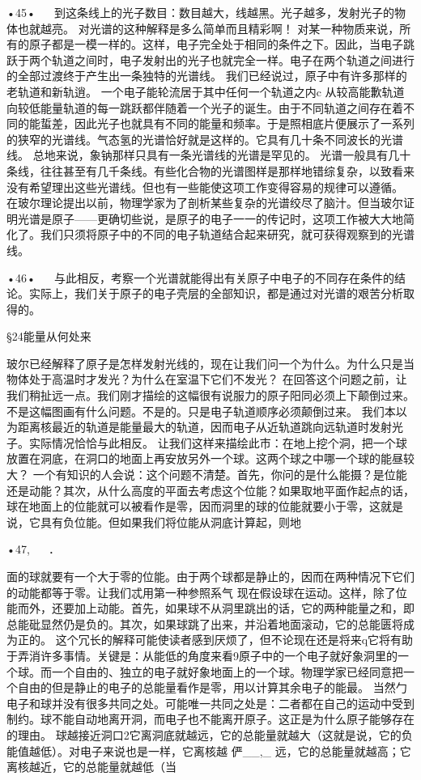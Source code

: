 •45•
  
到这条线上的光子数目：数目越大，线越黑。光子越多，发射光子的物体也就越亮。
对光谱的这种解释是多么简单而且精彩啊！
对某一种物质来说，所有的原子都是一模一样的。这样，电子完全处于相同的条件之下。因此，当电子跳跃于两个轨道之间时，电子发射出的光子也就完全一样。电子在两个轨道之间进行的全部过渡终于产生出一条独特的光谱线。
我们已经说过，原子中有许多那样的老轨道和新轨逍。
一个电子能轮流居于其中任何一个轨道之内c
从较高能歉轨道向较低能量轨道的每一跳跃都伴随着一个光子的诞生。由于不同轨道之间存在着不同的能蜇差，因此光子也就具有不同的能量和频率。于是照相底片便展示了一系列的狭窄的光谱线。气态氢的光谱恰好就是这样的。它具有几十条不同波长的光谱线。
总地来说，象钠那样只具有一条光谱线的光谱是罕见的。
光谱一般具有几十条线，往往甚至有几千条线。有些化合物的光谱图样是那样地错综复杂，以致看来没有希望理出这些光谱线。但也有一些能使这项工作变得容易的规律可以遵循。
在玻尔理论提出以前，物理学家为了剖析某些复杂的光谱绞尽了脑汁。但当玻尔证明光谱是原子——更确切些说，是原子的电子一一的传记时，这项工作被大大地简化了。我们只须将原子中的不同的电子轨道结合起来研究，就可获得观察到的光谱线。

•46•
  
与此相反，考察一个光谱就能得出有关原子中电子的不同存在条件的结论。实际上，我们关于原子的电子壳层的全部知识，都是通过对光谱的艰苦分析取得的。

§24能量从何处来

玻尔已经解释了原子是怎样发射光线的，现在让我们问一个为什么。为什么只是当物体处于高温时才发光？为什么在室温下它们不发光？
在回答这个问题之前，让我们稍扯远一点。我们刚才描绘的这幅很有说服力的原子阳同必须上下颠倒过来。不是这幅图画有什么问题。不是的。只是电子轨道顺序必须颠倒过来。
我们本以为距离核最近的轨道是能量最大的轨道，因而电子从近轨道跳向远轨道时发射光子。实际情况恰恰与此相反。
让我们这样来描绘此市：在地上挖个洞，把一个球放置在洞底，在洞口的地面上再安放另外一个球。这两个球之中哪一个球的能昼较大？
一个有知识的人会说：这个问题不清楚。首先，你问的是什么能摄？是位能还是动能？其次，从什么高度的平面去考虑这个位能？如果取地平面作起点的话，球在地面上的位能就可以被看作是零，因而洞里的球的位能就要小于零，这就是说，它具有负位能。但如果我们将位能从洞底计算起，则地

•47,
  
．

面的球就要有一个大于零的位能。由于两个球都是静止的，因而在两种情况下它们的动能都等于零。让我们忒用第一种参照系气
现在假设球在运动。这样，除了位能而外，还要加上动能。首先，如果球不从洞里跳出的话，它的两种能量之和，即总能砒显然仍是负的。其次，如果球跳了出来，并沿着地面滚动，它的总能匮将成为正的。
这个冗长的解释可能使读者感到厌烦了，但不论现在还是将来q它将有助于弄消许多事情。关键是：从能低的角度来看9原子中的一个电子就好象洞里的一个球。而一个自由的、独立的电子就好象地面上的一个球。物理学家已经同意把一个自由的但是静止的电子的总能量看作是零，用以计算其余电子的能最。
当然勹电子和球并没有很多共同之处。可能唯一共同之处是：二者都在自己的运动中受到制约。球不能自动地离开洞，而电子也不能离开原子。这正是为什么原子能够存在的理由。
球越接近洞口2它离洞底就越远，它的总能量就越大（这就是说，它的负能值越低）。对电子来说也是一样，它离核越
俨__,_
远，它的总能量就越高；它离核越近，它的总能量就越低（当

